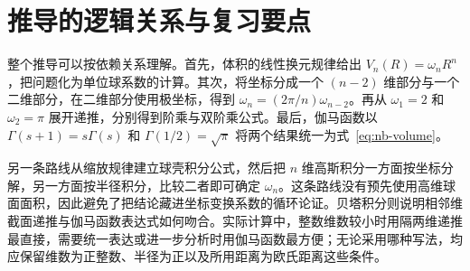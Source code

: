 \documentclass[UTF8,12pt,a4paper,fontset=fandol]{ctexart}
\begin{document}
\section{推导的逻辑关系与复习要点}
\label{sec:nb-conclusion}

整个推导可以按依赖关系理解。首先，体积的线性换元规律给出 $V_n(R)=\omega_nR^n$，把问题化为单位球系数的计算。其次，将坐标分成一个 $(n-2)$ 维部分与一个二维部分，在二维部分使用极坐标，得到 $\omega_n=(2\pi/n)\omega_{n-2}$。再从 $\omega_1=2$ 和 $\omega_2=\pi$ 展开递推，分别得到阶乘与双阶乘公式。最后，伽马函数以 $\Gamma(s+1)=s\Gamma(s)$ 和 $\Gamma(1/2)=\sqrt\pi$ 将两个结果统一为式~\eqref{eq:nb-volume}。

另一条路线从缩放规律建立球壳积分公式，然后把 $n$ 维高斯积分一方面按坐标分解，另一方面按半径积分，比较二者即可确定 $\omega_n$。这条路线没有预先使用高维球面面积，因此避免了把结论藏进坐标变换系数的循环论证。贝塔积分则说明相邻维截面递推与伽马函数表达式如何吻合。实际计算中，整数维数较小时用隔两维递推最直接，需要统一表达或进一步分析时用伽马函数最方便；无论采用哪种写法，均应保留维数为正整数、半径为正以及所用距离为欧氏距离这些条件。
\end{document}
